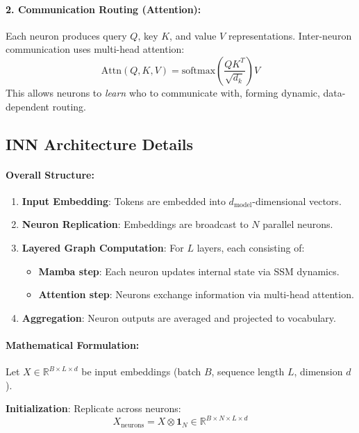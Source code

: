 \documentclass{article}
\begin{document}
\paragraph{2. Communication Routing (Attention):} Each neuron produces query $Q$, key $K$, and value $V$ representations. Inter-neuron communication uses multi-head attention:
\begin{equation}
\text{Attn}(Q, K, V) = \text{softmax}\left(\frac{QK^T}{\sqrt{d_k}}\right) V
\end{equation}
This allows neurons to \emph{learn} who to communicate with, forming dynamic, data-dependent routing.

\subsection{INN Architecture Details}

\paragraph{Overall Structure:}
\begin{enumerate}
    \item \textbf{Input Embedding}: Tokens are embedded into $d_{\text{model}}$-dimensional vectors.
    \item \textbf{Neuron Replication}: Embeddings are broadcast to $N$ parallel neurons.
    \item \textbf{Layered Graph Computation}: For $L$ layers, each consisting of:
    \begin{itemize}
        \item \textbf{Mamba step}: Each neuron updates internal state via SSM dynamics.
        \item \textbf{Attention step}: Neurons exchange information via multi-head attention.
    \end{itemize}
    \item \textbf{Aggregation}: Neuron outputs are averaged and projected to vocabulary.
\end{enumerate}

\paragraph{Mathematical Formulation:}

Let $X \in \mathbb{R}^{B \times L \times d}$ be input embeddings (batch $B$, sequence length $L$, dimension $d$).

\textbf{Initialization}: Replicate across neurons:
\begin{equation}
X_{\text{neurons}} = X \otimes \mathbf{1}_N \in \mathbb{R}^{B \times N \times L \times d}
\end{equation}
\end{document}
